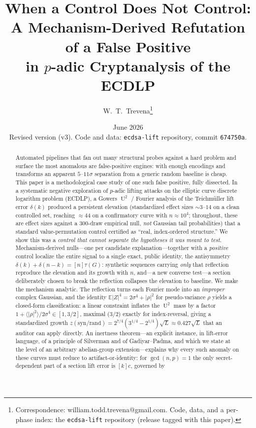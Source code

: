 \documentclass[11pt]{article}
\title{\bf When a Control Does Not Control:\\
A Mechanism-Derived Refutation of a False Positive\\
in $p$-adic Cryptanalysis of the ECDLP}
\author{W.\ T.\ Trevena\thanks{Correspondence: william.todd.trevena@gmail.com.
Code, data, and a per-phase index: the \texttt{ecdsa-lift} repository
(release tagged with this paper).}}
\date{June 2026\\[2pt]
{\small Revised version (v3). Code and data: \texttt{ecdsa-lift} repository,
commit \texttt{674750a}.}}
\theoremstyle{definition}
\DeclareMathOperator{\Uk}{U}
\begin{document}
\maketitle

\begin{abstract}
Automated pipelines that fan out many structural probes against a hard
problem and surface the most anomalous are false-positive engines: with
enough encodings and transforms an apparent $5$--$11\sigma$ separation
from a generic random baseline is cheap. This paper is a methodological
case study of one such false positive, fully dissected. In a systematic
negative exploration of $p$-adic lifting attacks on the elliptic curve
discrete logarithm problem (ECDLP), a Gowers $\Uk^2$ / Fourier analysis
of the Teichm\"uller lift error $\delta(k)$ produced a persistent
elevation (standardized effect sizes $\sim$$3$--$14$ on a clean controlled
set, reaching $\approx44$ on a confirmatory curve with $n\approx 10^4$;
throughout, these are effect sizes against a $300$-draw empirical null,
\emph{not} Gaussian tail probabilities) that a standard value-permutation
control certified as ``real, index-ordered structure.'' We show this was a
\emph{control that cannot separate the hypotheses it was meant to test}.
Mechanism-derived nulls---one per candidate explanation---together with a
\emph{positive} control localize the entire signal to a single exact,
public identity, the antisymmetry $\delta(k)+\delta(n-k)=[n]\tau(G)$:
synthetic sequences carrying \emph{only} that reflection reproduce the
elevation and its growth with $n$, and---a new converse test---a section
deliberately chosen to break the reflection collapses the elevation to
baseline. We make the mechanism analytic. The reflection turns each
Fourier mode into an \emph{improper} complex Gaussian, and the identity
$\mathbb E|Z|^4=2\sigma^4+|\rho|^2$ for pseudo-variance $\rho$ yields a
closed-form classification: a linear constraint inflates the $\Uk^2$ mass
by a factor $1+\langle|\rho|^2\rangle/2\sigma^4\in[1,3/2]$, maximal
($3/2$) exactly for index-reversal, giving a standardized growth
$z(\mathrm{syn/rand})=2^{7/4}(3^{1/4}-2^{1/4})\sqrt L\approx0.427\sqrt L$
that an auditor can apply directly. An inertness theorem---an explicit
instance, in lift-error language, of a principle of Silverman and of
Gadiyar--Padma, and which we state at the level of an arbitrary
abelian-group extension---explains why every such anomaly on these curves
must reduce to artifact-or-identity: for $\gcd(n,p)=1$ the only
secret-dependent part of a section lift error is $[k]c$, governed by
$$
\end{abstract}
\end{document}
